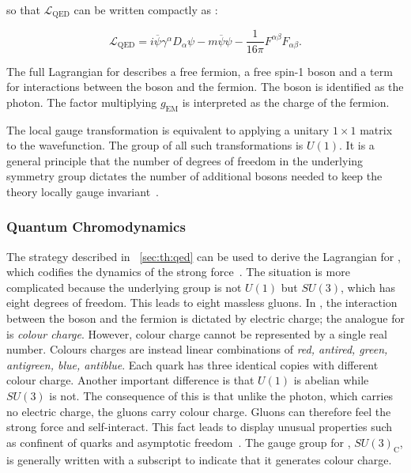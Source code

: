 so that $\mathcal{L}_{\textrm{QED}}$ can be written compactly as :

\begin{equation}
\label{eq:th:QED_lagrangian}
\mathcal{L}_{\textrm{QED}} = i\overline{\psi} \gamma^{\alpha} D_{\alpha} \psi - m\overline{\psi}\psi -\frac{1}{16\pi} F^{\alpha\beta}F_{\alpha\beta}.
\end{equation}

The full Lagrangian for \QED describes a free fermion, a free spin-1 boson and a term for interactions between the boson and the fermion. The boson is identified as the photon. The factor multiplying $g_{\textrm{EM}}$ is interpreted as the charge of the fermion.

The local gauge transformation is equivalent to applying a unitary $1\times1$ matrix to the wavefunction. The group of all such transformations is $U(1)$. It is a general principle that the number of degrees of freedom in the underlying symmetry group dictates the number of additional bosons needed to keep the theory locally gauge invariant~\cite{griffiths2008introduction}. 

\subsubsection{Quantum Chromodynamics}

The strategy described in \Sec~\ref{sec:th:qed} can be used to derive the Lagrangian for \QCD, which codifies the dynamics of the strong force~\cite{griffiths2008introduction}.  %
The situation is more complicated because the underlying group is not $U(1)$ but $SU(3)$, which has eight degrees of freedom. This leads to eight massless gluons. In \QED, the interaction between the boson and the fermion is dictated by electric charge; the analogue for \QCD is \emph{colour charge}. However, colour charge cannot be represented by a single real number. Colours charges are instead linear combinations of \emph{red, antired, green, antigreen, blue, antiblue}. Each \SM quark has three identical copies with different colour charge. Another important difference is that $U(1)$ is abelian while $SU(3)$ is not. The consequence of this is that unlike the \QED photon, which carries no electric charge, the \QCD gluons carry colour charge. Gluons can therefore feel the strong force and self-interact. This fact leads \QCD to display unusual properties such as confinent of quarks and asymptotic freedom~\cite{PhysRevLett.30.1346,PhysRevLett.30.1343}. The gauge group for \QCD, $SU(3)_{\textrm{C}}$, is generally written with a subscript to indicate that it generates colour charge. 

